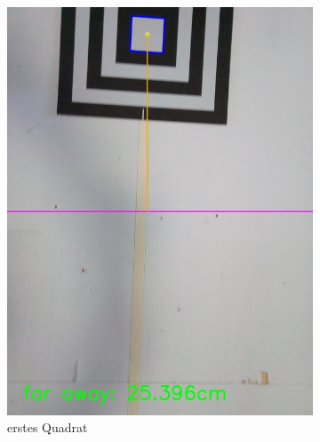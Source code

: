 \begin{figure}
\begin{subfigure}{0.3\textwidth}
        \includegraphics[width=0.95\linewidth]{pics/zielfeld/02.jpg}
        \caption{erstes Quadrat}
        \label{fig:zielfeld2}
    \end{subfigure}
    \begin{subfigure}{0.3\textwidth}
        \centering

\end{subfigure}
\end{figure}
